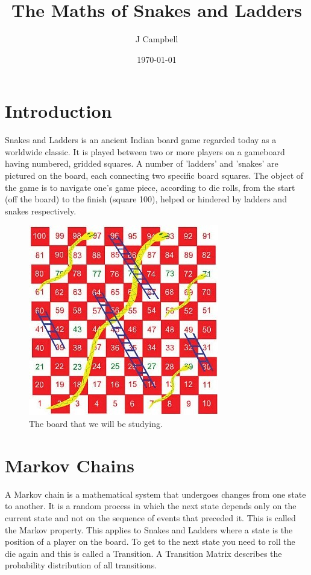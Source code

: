 \documentclass[a4paper]{article}
\title{The Maths of Snakes and Ladders}
\author{J Campbell}
\date{\today}
\begin{document}
\maketitle
\section{Introduction}
Snakes and Ladders is an ancient Indian board game regarded today as a worldwide classic. It is played between two or more players on a gameboard having numbered, gridded squares. A number of 'ladders' and 'snakes' are pictured on the board, each connecting two specific board squares. The object of the game is to navigate one's game piece, according to die rolls, from the start (off the board) to the finish (square 100), helped or hindered by ladders and snakes respectively.\cite{wiki:ButterflyEffect}

\begin{figure}[!htbp]
\begin{center}
\includegraphics[scale=2.5]{images/SALboard}
\end{center}
\caption{The board that we will be studying.}
\label{board}
\end{figure}

\section{Markov Chains}
A Markov chain is a mathematical system that undergoes changes from one state to another. It is a random process in which the next state depends only on the current state and not on the sequence of events that preceded it. This is called the Markov property. This applies to Snakes and Ladders where a state is the position of a player on the board. To get to the next state you need to roll the die again and this is called a Transition. A Transition Matrix describes the probability distribution of all transitions.
\end{document}
